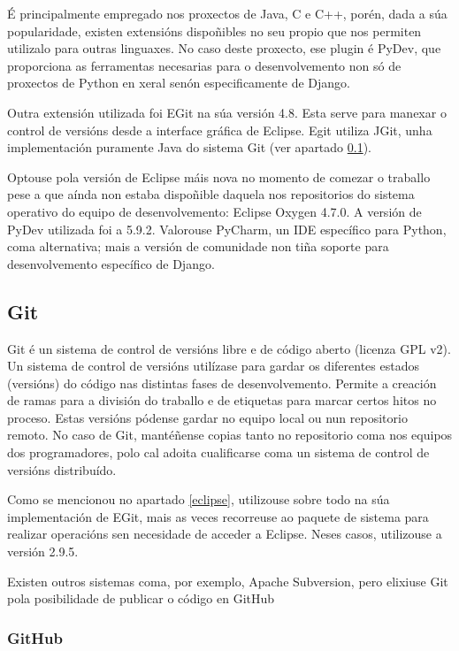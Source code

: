 É principalmente empregado nos proxectos de Java, C e C++, porén, dada a súa popularidade, existen extensións dispoñibles no seu propio  que nos permiten utilizalo para outras linguaxes. No caso deste proxecto, ese plugin é PyDev, que proporciona as ferramentas necesarias para o desenvolvemento non só de proxectos de Python en xeral senón especificamente de Django.

Outra extensión utilizada foi EGit na súa versión 4.8. Esta serve para manexar o control de versións  desde a interface gráfica de Eclipse. Egit utiliza JGit, unha implementación puramente Java do sistema Git (ver apartado \ref{git}).

Optouse pola versión de Eclipse máis nova no momento de comezar o traballo pese a que aínda non estaba dispoñible daquela nos repositorios do sistema operativo do equipo de desenvolvemento: Eclipse Oxygen 4.7.0. A versión de PyDev utilizada foi a 5.9.2. Valorouse PyCharm, un IDE específico para Python, coma alternativa; mais a versión de comunidade non tiña soporte para desenvolvemento específico de Django\cite{pycharm}.
 


\subsection{Git}
\label{git}

Git é un sistema de control de versións libre e de código aberto (licenza GPL v2). Un sistema de control de versións utilízase para gardar os diferentes estados (versións) do código nas distintas fases de desenvolvemento. Permite a creación de ramas para a división do traballo e de etiquetas para marcar certos hitos no proceso. Estas versións pódense gardar no equipo local ou nun repositorio remoto. No caso de Git, mantéñense copias tanto no repositorio coma nos equipos dos programadores, polo cal adoita cualificarse coma un sistema de control de versións distribuído\cite{git}.

Como se mencionou no apartado \ref{eclipse}, utilizouse sobre todo na súa implementación de EGit, mais as veces recorreuse ao paquete de sistema para realizar operacións sen necesidade de acceder a Eclipse. Neses casos, utilizouse a versión 2.9.5.

Existen outros sistemas coma, por exemplo, Apache Subversion, pero elixiuse Git pola posibilidade de publicar o código en GitHub

\subsubsection{GitHub}  

